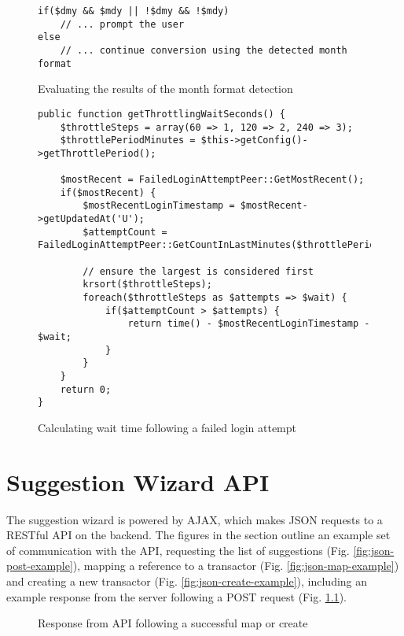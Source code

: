 \begin{appendices}
\begin{figure}
\lstset{style=phpcolor}
\begin{lstlisting}
if($dmy && $mdy || !$dmy && !$mdy)
    // ... prompt the user
else
    // ... continue conversion using the detected month format
\end{lstlisting}
\caption{Evaluating the results of the month format detection}
\end{figure}

\begin{figure}
\centering
\begin{lstlisting}[style=phpcolor]
public function getThrottlingWaitSeconds() {
	$throttleSteps = array(60 => 1, 120 => 2, 240 => 3);
	$throttlePeriodMinutes = $this->getConfig()->getThrottlePeriod();
	
	$mostRecent = FailedLoginAttemptPeer::GetMostRecent();		
	if($mostRecent) {
		$mostRecentLoginTimestamp = $mostRecent->getUpdatedAt('U');
		$attemptCount = FailedLoginAttemptPeer::GetCountInLastMinutes($throttlePeriodMinutes);
		
		// ensure the largest is considered first
		krsort($throttleSteps);
		foreach($throttleSteps as $attempts => $wait) {
			if($attemptCount > $attempts) {
				return time() - $mostRecentLoginTimestamp - $wait;
			}
		}
	}
	return 0;
}
\end{lstlisting}
\caption{Calculating wait time following a failed login attempt}
\label{fig:getThrottlingWaitSeconds}
\end{figure}

\chapter{Suggestion Wizard API} \label{app:suggestionwizard-api}

The suggestion wizard is powered by AJAX, which makes JSON requests to a RESTful API on the backend. The figures in the section outline an example set of communication with the API, requesting the list of suggestions (Fig. \ref{fig:json-post-example}), mapping a reference to a transactor (Fig. \ref{fig:json-map-example}) and creating a new transactor (Fig. \ref{fig:json-create-example}), including an example response from the server following a POST request (Fig. \ref{fig:json-response-example}).  


\begin{figure}
    
    \caption{Response from API following a successful map or create}
    \label{fig:json-response-example}
\end{figure}


\end{appendices}
